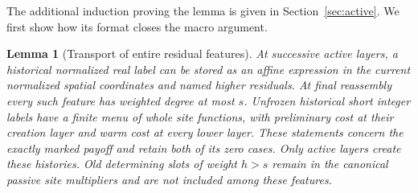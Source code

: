 \documentclass[11pt,a4paper]{article}
\newtheorem{lemma}[theorem]{Lemma}
\theoremstyle{definition}
\begin{document}
The additional induction proving the lemma is given in
Section~\ref{sec:active}. We first show how its format closes the macro
argument.

\begin{lemma}[Transport of entire residual features]\label{lem:transport}
At successive active layers, a historical normalized real label can be
stored as an affine expression in the current normalized spatial
coordinates and named higher residuals. At final reassembly every such
feature has weighted degree at most \(s\). Unfrozen historical short
integer labels have a finite menu of whole site functions, with
preliminary cost at their creation layer and warm cost at every lower
layer. These statements concern the exactly marked payoff and retain
both of its zero cases. Only active layers create these histories.
Old determining slots of weight \(h>s\) remain in the canonical
passive site multipliers and are not included among these features.
\end{lemma}
\end{document}
